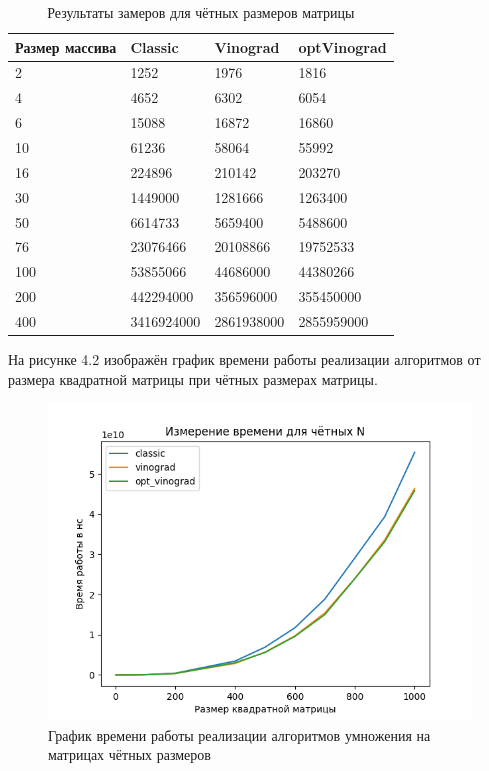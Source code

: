 \FloatBarrier
\begin{table}[h!]
	\centering
	\begin{center}
	\begin{threeparttable}
	\caption{Результаты замеров для чётных размеров матрицы}

	\begin{tabular}{ | l | l | l | l |}
		\hline
		Размер массива & Classic & Vinograd & optVinograd \\ \hline
		2 &       1252 &       1976 &          1816 \\
		4 &       4652 &       6302 &          6054 \\
		6 &      15088 &      16872 &         16860 \\
	   10 &      61236 &      58064 &         55992 \\
	   16 &     224896 &     210142 &        203270 \\
	   30 &    1449000 &    1281666 &       1263400 \\
	   50 &    6614733 &    5659400 &       5488600 \\
	   76 &   23076466 &   20108866 &      19752533 \\
	  100 &   53855066 &   44686000 &      44380266 \\
	  200 &  442294000 &  356596000 &     355450000 \\
	  400 & 3416924000 & 2861938000 &    2855959000 \\
		\hline
	\end{tabular}
\end{threeparttable}
\end{center}
\end{table}
\FloatBarrier

На рисунке 4.2 изображён график времени работы реализации алгоритмов от размера 
квадратной матрицы при чётных размерах матрицы.

\FloatBarrier
\begin{figure}[h!]
	\begin{center}
		\includegraphics[width=\linewidth]{inc/chet.png}
	\end{center}
	\caption{График времени работы реализации алгоритмов умножения на матрицах чётных размеров}
\end{figure}
\FloatBarrier


